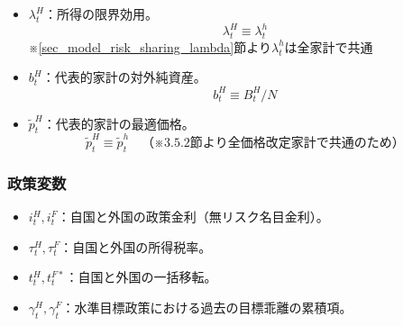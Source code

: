 \begin{itemize}
    \item
    \label{itm:model_variables_endogenous_representative_lambda_H}
        \(\lambda_t^H\)：所得の限界効用。
        \begin{equation}
        \label{form:model_variables_endogenous_representative_lambda_H_def}
            \lambda_t^H\equiv\lambda_t^h
        \end{equation}
        ※\ref{sec_model_risk_sharing_lambda}節より\(\lambda_t^h\)は全家計で共通
    \item
    \label{itm:model_variables_endogenous_representative_b_H}
        \(b_t^H\)：代表的家計の対外純資産。
        \begin{equation}
        \label{form:model_variables_endogenous_representative_b_H_def}
            b_t^H\equiv B_t^H/N
        \end{equation}
    \item
    \label{itm:model_variables_endogenous_representative_p_H_tilde}
        \(\widetilde{p}_t^H\)：代表的家計の最適価格。
        \begin{equation}
        \label{form:model_variables_endogenous_representative_p_H_tilde_def}
            \widetilde{p}_t^H\equiv\widetilde{p}_t^h\quad（※3.5.2節より全価格改定家計で共通のため）
        \end{equation}
\end{itemize}
\subsubsection*{政策変数}
\label{sec:model_variables_endogenous_policy}
\begin{itemize}
    \item
    \label{itm:model_variables_endogenous_policy_i}
        \(i_t^H,i_t^F\)：自国と外国の政策金利（無リスク名目金利）。
    \item
    \label{itm:model_variables_endogenous_policy_tau}
        \(\tau_t^H,\tau_t^F\)：自国と外国の所得税率。
    \item
    \label{itm:model_variables_endogenous_policy_t}
        \(t_t^H,t_t^{F*}\)：自国と外国の一括移転。
    \item
    \label{itm:model_variables_endogenous_policy_gamma}
        \(\gamma_t^H,\gamma_t^F\)：水準目標政策における過去の目標乖離の累積項。
\end{itemize}
